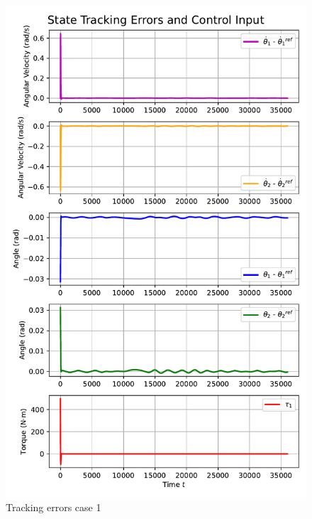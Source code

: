 \begin{figure}[htb]
    \centering
    \includegraphics[width=1\linewidth]{img/3-task3/LQR1_errors.pdf}
    \caption{Tracking errors case 1}
    \label{fig:dtheta1-evolution}
\end{figure}

